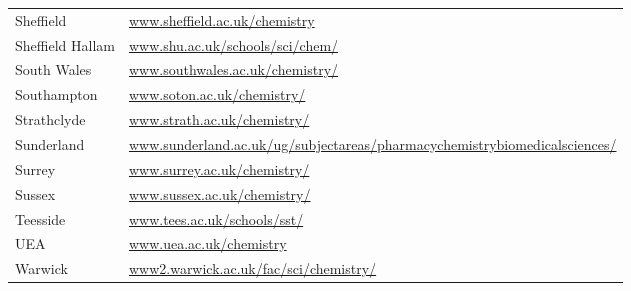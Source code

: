 \begin{table}[H]
\begin{tabular}{||p{4cm}|Y||}
 \footnotesize{Sheffield         }                 & \footnotesize{\url{www.sheffield.ac.uk/chemistry}}                                                                                                 \\
 \footnotesize{Sheffield Hallam }                  & \footnotesize{\url{www.shu.ac.uk/schools/sci/chem/}}                                                                                               \\
 \footnotesize{South Wales  }                      & \footnotesize{\url{www.southwales.ac.uk/chemistry/}}                                                                                               \\
 \footnotesize{Southampton }                       & \footnotesize{\url{www.soton.ac.uk/chemistry/}}                                                                                                    \\
 \footnotesize{Strathclyde}                        & \footnotesize{\url{www.strath.ac.uk/chemistry/}}                                                                                                   \\
 \footnotesize{Sunderland}                         & \footnotesize{\url{www.sunderland.ac.uk/ug/subjectareas/pharmacychemistrybiomedicalsciences/}}                                                     \\
 \footnotesize{Surrey }                            & \footnotesize{\url{www.surrey.ac.uk/chemistry/}}                                                                                                   \\
 \footnotesize{Sussex                            } & \footnotesize{\url{www.sussex.ac.uk/chemistry/}}                                                                                                   \\
 \footnotesize{Teesside                         }  & \footnotesize{\url{www.tees.ac.uk/schools/sst/}}                                                                                                   \\
 \footnotesize{UEA                             }   & \footnotesize{\url{www.uea.ac.uk/chemistry}}                                                                                                       \\
 \footnotesize{Warwick                        }    & \footnotesize{\url{www2.warwick.ac.uk/fac/sci/chemistry/}}                                                                                         \\

\end{tabular}
\end{table}
